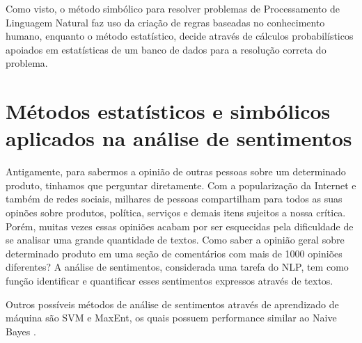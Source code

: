 Como visto, o método simbólico para resolver problemas de Processamento de
Linguagem Natural faz uso da criação de regras baseadas no conhecimento humano,
enquanto o método estatístico, decide através de cálculos probabilísticos
apoiados em estatísticas de um banco de dados para a resolução correta do
problema.


%
%
%

\chapter{Métodos estatísticos e simbólicos aplicados na análise de sentimentos}
\label{cap:Classificadores}

Antigamente, para sabermos a opinião de outras pessoas sobre um
determinado produto, tinhamos que perguntar diretamente. Com a
popularização da Internet e também de redes sociais, milhares de pessoas
compartilham para todos as suas opinões sobre produtos, política, serviços e
demais itens sujeitos a nossa crítica. Porém, muitas vezes essas opiniões acabam
por ser esquecidas pela dificuldade de se analisar uma grande quantidade de
textos. Como saber a opinião geral sobre determinado produto em uma seção de
comentários com mais de 1000 opiniões diferentes? A análise de sentimentos,
considerada uma tarefa do \ac{NLP}, tem como função identificar e quantificar
esses sentimentos expressos através de textos.

Outros possíveis métodos de análise de sentimentos através de aprendizado de
máquina são \ac{SVM} e \ac{MaxEnt}, os quais possuem
performance similar ao Naive Bayes \cite{domingos97naivebayes}.


